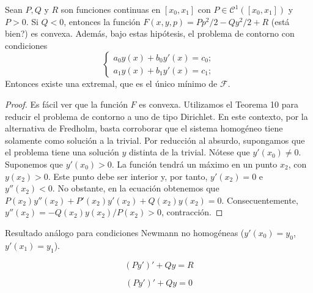 \documentclass{article}
\begin{document}
\begin{thm}
  Sean $P, Q$ y $R$ son funciones continuas en $[x_0, x_1]$ con $P \in \mathcal{C}^1([x_0, x_1])$ y
  $P > 0$. Si $Q < 0$, entonces la función $F(x,y,p) = P p^2/2 - Q y^2/2 + R$ (está bien?) es
  convexa. Además, bajo estas hipótesis, el problema de contorno con condiciones
  \begin{equation}
    \begin{cases}
      a_0 y(x) + b_0 y'(x) = c_0; \\
      a_1 y(x) + b_1 y'(x) = c_1;
    \end{cases}
  \end{equation}
  Entonces existe una extremal, que es el único mínimo de $\mathcal{F}$.
\end{thm}
\begin{proof}
  Es fácil ver que la función $F$ es convexa. Utilizamos el Teorema 10 para reducir el problema de
  contorno a uno de tipo Dirichlet. En este contexto, por la alternativa de Fredholm, basta
  corroborar que el sistema homogéneo tiene solamente como solución a la trivial. Por reducción al
  absurdo, supongamos que el problema tiene una solución $y$ distinta de la trivial. Nótese que
  $y'(x_0) \ne 0$. Suponemos que $y'(x_0) > 0$. La función tendrá un máximo en un punto $x_2$, con
  $y(x_2) > 0$. Este punto debe ser interior y, por tanto, $y'(x_2) = 0$ e $y''(x_2) < 0$. No
  obstante, en la ecuación obtenemos que $P(x_2)y''(x_2) + P'(x_2)y'(x_2) + Q(x_2) y(x_2) =
  0$. Consecuentemente, $y''(x_2) = - Q(x_2) y(x_2) / P(x_2) > 0$, contracción.
\end{proof}

\begin{ex}
  
\end{ex}

\begin{ex}
  Resultado análogo para condiciones Newmann no homogéneas ($y'(x_0) = y_0$, $y'(x_1) = y_1$).
\end{ex}

\begin{ex}
  
\end{ex}

\begin{equation}
  \label{eq:sturm:ec}
  (Py')' + Qy = R
\end{equation}

\begin{equation}
  \label{eq:sturm:eh}
  (Py')' + Qy = 0
\end{equation}
\end{document}

